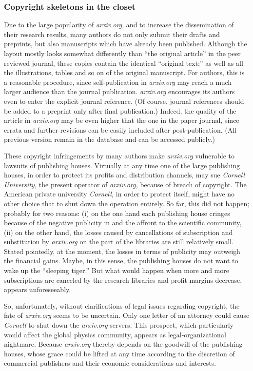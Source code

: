 \subsubsection{Copyright skeletons in the closet}

Due to the large popularity of {\it arxiv.org}, and to increase the
dissemination of their research results, many authors do not only submit
their drafts and preprints, but also manuscripts which have already been
published.  Although the layout mostly looks somewhat differently than
``the original article'' in the peer reviewed journal, these copies
contain the identical ``original text;'' as well as all the
illustrations, tables and so on of the original manuscript.  For
authors, this is a reasonable procedure, since self-publication in {\it
arxiv.org} may reach a much larger audience than the journal
publication.
{\it arxiv.org} encourages its authors even to enter the
explicit journal reference.
(Of course, journal references should
be added to a preprint only after final publication.)
Indeed, the quality of the article in {\it arxiv.org} may be even higher
that the one in the paper journal, since errata and further revisions
can be easily included after post-publication.  (All previous version
remain in the database and can be accessed publicly.)

These copyright infringements by many authors make {\it arxiv.org}
vulnerable to lawsuits of publishing houses.  Virtually at any time one
of the large publishing houses, in order to protect its profits and
distribution channels, may sue {\it Cornell University,}
the present operator of {\it arxiv.org,}  because of breach of
copyright.  The American private university {\it Cornell,} in order to
protect itself, might have no other choice that to shut down the
operation entirely. So far, this did not happen; probably for two
reasons:  (i) on the one hand each publishing house cringes because of
the negative publicity in and the affront to the scientific community,
(ii) on the other hand, the losses caused by cancellations of
subscription and substitution by {\it arxiv.org} on the part of the
libraries are still relatively small.  Stated pointedly, at the moment,
the losses in terms of publicity may outweigh the financial gains.
Maybe, in this sense, the publishing houses do not want to wake up the
``sleeping tiger.''  But what would happen when more and more
subscriptions are canceled by the research libraries and profit margins
decrease, appears unforeseeably.

So, unfortunately, without clarifications of legal issues regarding
copyright, the fate of {\it arxiv.org} seems to be uncertain.  Only one
letter of an attorney could cause {\it Cornell} to shut down the {\it
arxiv.org} servers.  This prospect, which particularly would affect the
global physics community, appears as legal-organizational nightmare.
Because {\it arxiv.org} thereby depends on the goodwill of the
publishing houses, whose grace could be lifted at any time according to
the discretion of commercial publishers and their economic
considerations and interests.

